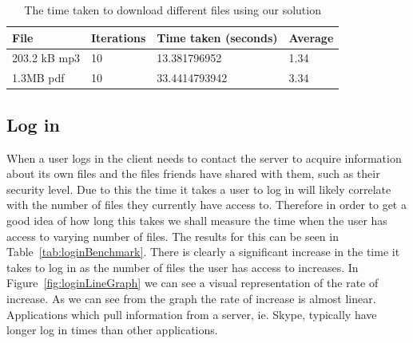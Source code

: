 \documentclass[12pt, titlepage]{article}
\begin{document}
\bigskip
\begin{table}[h]
\begin{center}
    \begin{tabular}{ | l | l | l | l |}
    \hline
    \textbf{File} & \textbf{Iterations} & \textbf{Time taken (seconds)} & \textbf{Average} \\ \hline
    203.2 kB mp3 & 10 & 13.381796952 & 1.34 \\ \hline
    1.3MB pdf  & 10 &  33.4414793942 & 3.34 \\ \hline
    
    \end{tabular}
    \caption{The time taken to download different files using our solution} \label{tab:downloadBenchmark}
    \end{center}
    \end{table}
\bigskip


\subsection{Log in}
When a user logs in the client needs to contact the server to acquire information about its own files and the files friends have shared with them, such as their security level. Due to this the time it takes a user to log in will likely correlate with the number of files they currently have access to. Therefore in order to get a good idea of how long this takes we shall measure the time when the user has access to varying number of files. The results for this can be seen in Table~\ref{tab:loginBenchmark}.
\newline \indent There is clearly a significant increase in the time it takes to log in as the number of files the user has access to increases. In Figure~\ref{fig:loginLineGraph} we can see a visual representation of the rate of increase. As we can see from the graph the rate of increase is almost linear.
\newline \indent Applications which pull information from a server, ie. Skype, typically have longer log in times than other applications.
\end{document}
